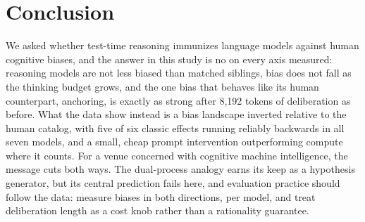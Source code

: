 \documentclass[conference]{IEEEtran}
\begin{document}
\section{Conclusion}

We asked whether test-time reasoning immunizes language models against human cognitive biases, and the answer in this study is no on every axis measured: reasoning models are not less biased than matched siblings, bias does not fall as the thinking budget grows, and the one bias that behaves like its human counterpart, anchoring, is exactly as strong after 8,192 tokens of deliberation as before. What the data show instead is a bias landscape inverted relative to the human catalog, with five of six classic effects running reliably backwards in all seven models, and a small, cheap prompt intervention outperforming compute where it counts. For a venue concerned with cognitive machine intelligence, the message cuts both ways. The dual-process analogy earns its keep as a hypothesis generator, but its central prediction fails here, and evaluation practice should follow the data: measure biases in both directions, per model, and treat deliberation length as a cost knob rather than a rationality guarantee.



\end{document}
